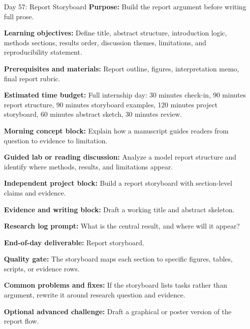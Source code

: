 \begin{dailybox}{Day 57: Report Storyboard}
\textbf{Purpose:} Build the report argument before writing full prose.

\textbf{Learning objectives:} Define title, abstract structure, introduction logic, methods sections, results order, discussion themes, limitations, and reproducibility statement.

\textbf{Prerequisites and materials:} Report outline, figures, interpretation memo, final report rubric.

\textbf{Estimated time budget:} Full internship day: 30 minutes check-in, 90 minutes report structure, 90 minutes storyboard examples, 120 minutes project storyboard, 60 minutes abstract sketch, 30 minutes review.

\textbf{Morning concept block:} Explain how a manuscript guides readers from question to evidence to limitation.

\textbf{Guided lab or reading discussion:} Analyze a model report structure and identify where methods, results, and limitations appear.

\textbf{Independent project block:} Build a report storyboard with section-level claims and evidence.

\textbf{Evidence and writing block:} Draft a working title and abstract skeleton.

\textbf{Research log prompt:} What is the central result, and where will it appear?

\textbf{End-of-day deliverable:} Report storyboard.

\textbf{Quality gate:} The storyboard maps each section to specific figures, tables, scripts, or evidence rows.

\textbf{Common problems and fixes:} If the storyboard lists tasks rather than argument, rewrite it around research question and evidence.

\textbf{Optional advanced challenge:} Draft a graphical or poster version of the report flow.
\end{dailybox}

